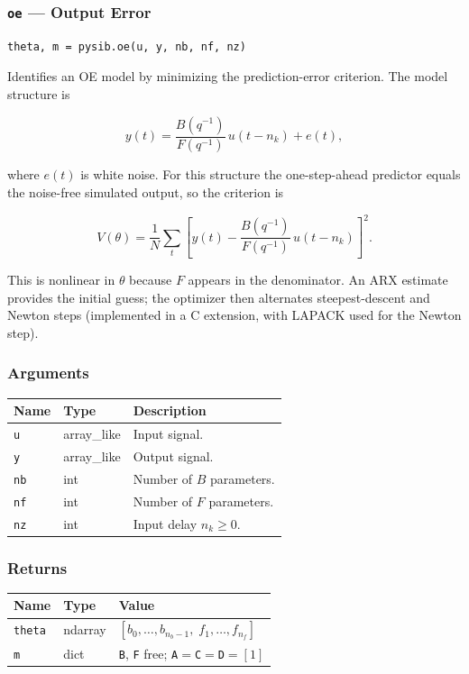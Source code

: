 \documentclass[../main]{subfiles}
\begin{document}
\newpage

\subsubsection{\texttt{oe} --- Output Error}

\begin{lstlisting}
theta, m = pysib.oe(u, y, nb, nf, nz)
\end{lstlisting}

Identifies an OE model by minimizing the prediction-error criterion.
The model structure is

\[
  y(t) = \frac{B(q^{-1})}{F(q^{-1})}\,u(t - n_k) + e(t),
\]

where $e(t)$ is white noise.
For this structure the one-step-ahead predictor equals the
noise-free simulated output, so the criterion is

\[
  V(\theta) = \frac{1}{N}\sum_t
  \left[y(t) - \frac{B(q^{-1})}{F(q^{-1})}\,u(t-n_k)\right]^2.
\]

This is nonlinear in $\theta$ because $F$ appears in the denominator.
An ARX estimate provides the initial guess; the optimizer then
alternates steepest-descent and Newton steps (implemented in a C
extension, with LAPACK used for the Newton step).

\subsubsection*{Arguments}
\begin{center}
\begin{tabular}{lll}
  \toprule
  Name & Type & Description \\
  \midrule
  \texttt{u}  & array\_like & Input signal. \\
  \texttt{y}  & array\_like & Output signal. \\
  \texttt{nb} & int & Number of $B$ parameters. \\
  \texttt{nf} & int & Number of $F$ parameters. \\
  \texttt{nz} & int & Input delay $n_k \geq 0$. \\
  \bottomrule
\end{tabular}
\end{center}

\subsubsection*{Returns}
\begin{center}
\begin{tabular}{lll}
  \toprule
  Name & Type & Value \\
  \midrule
  \texttt{theta} & ndarray & $[b_0,\ldots,b_{n_b-1},\; f_1,\ldots,f_{n_f}]$ \\
  \texttt{m}     & dict    & \texttt{B}, \texttt{F} free; \texttt{A}$=$\texttt{C}$=$\texttt{D}$=[1]$ \\
  \bottomrule
\end{tabular}
\end{center}
\end{document}

